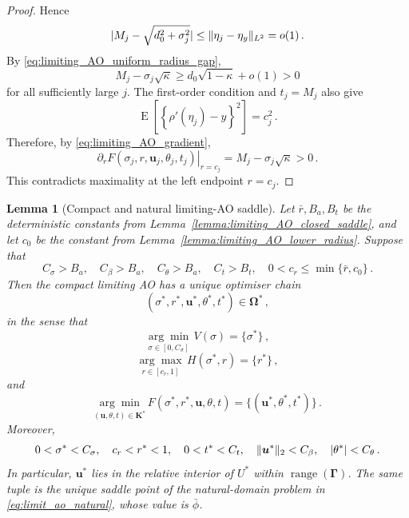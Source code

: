 \documentclass{article}
\makeatletter
\DeclareMathOperator{\expect}{E}
\newtheorem{lemma}{Lemma}
\theoremstyle{definition}
\newcommand{\vnorm}[1]{%
	\ensuremath{%
		\if@display
		\left\| #1 \right\|
		\else
		\| #1 \|
		\fi
	}%
}
\newcommand{\abs}[1]{%
	\ensuremath{%
		\if@display
		\left| #1 \right|
		\else
		\lvert #1 \rvert
		\fi
	}%
}
\newcommand*{\bb}{\boldsymbol}
\def\bu{\bb{u}}
\newcommand{\range}{\operatorname{range}}
\makeatother
\begin{document}
\begin{bibunit}
\begin{proof}
Hence
$$
    \abs{
        M_j-\sqrt{d_0^2+\sigma_j^2}
    }
    \leq
    \vnorm{\eta_j-\eta_y}_{L^2}
    =
    o(1)\,.
$$
By \eqref{eq:limiting_AO_uniform_radius_gap},
$$
    M_j-\sigma_j\sqrt\kappa
    \geq
    d_0\sqrt{1-\kappa}
    +
    o(1)
    >
    0
$$
for all sufficiently large $j$.
The first-order condition and $t_j=M_j$ also give
$$
    \expect
    \left[
        \left\{
            \rho'(\eta_j)-y
        \right\}^2
    \right]
    =
    c_j^2\,.
$$
Therefore, by \eqref{eq:limiting_AO_gradient},
$$
    \left.
    \partial_r
    F(\sigma_j,r,\bu_j,\theta_j,t_j)
    \right|_{r=c_j}
    =
    M_j-\sigma_j\sqrt\kappa
    >
    0\,.
$$
This contradicts maximality at the left endpoint $r=c_j$.
\end{proof}

\begin{lemma}[Compact and natural limiting-AO saddle]
\label{lemma:limiting_AO_natural_domain}
Let $\bar r,B_a,B_t$ be the deterministic constants from
Lemma~\ref{lemma:limiting_AO_closed_saddle}, and let $c_0$ be the
constant from Lemma~\ref{lemma:limiting_AO_lower_radius}. Suppose that
$$
    C_\sigma>B_a,
    \quad
    C_\beta>B_a,
    \quad
    C_\theta>B_a,
    \quad
    C_t>B_t,
    \quad
    0<c_r\leq\min\{\bar r,c_0\}\,.
$$
Then the compact limiting AO has a unique optimiser chain
$$
    (\sigma^*,r^*,\bu^*,\theta^*,t^*)\in\bb\Omega^*\,,
$$
in the sense that
$$
    \underset{\sigma\in[0,C_\sigma]}{\arg\min}\,
    V(\sigma)
    =
    \{\sigma^*\}\,,
$$
$$
    \underset{r\in[c_r,1]}{\arg\max}\,
    H(\sigma^*,r)
    =
    \{r^*\}\,,
$$
and
$$
    \underset{(\bu,\theta,t)\in\bb K^*}{\arg\min}\,
    F(\sigma^*,r^*,\bu,\theta,t)
    =
    \{(\bu^*,\theta^*,t^*)\}\,.
$$
Moreover,
$$
    0<\sigma^*<C_\sigma,
    \quad
    c_r<r^*<1,
    \quad
    0<t^*<C_t,
    \quad
    \vnorm{\bu^*}_2<C_\beta,
    \quad
    \abs{\theta^*}<C_\theta\,.
$$
In particular, $\bu^*$ lies in the relative interior of $U^*$ within
$\range(\bb\Gamma)$. The same tuple is the unique saddle point of the
natural-domain problem in \eqref{eq:limit_ao_natural}, whose value is
$\bar\phi$.
\end{lemma}


\end{bibunit}
\end{document}
